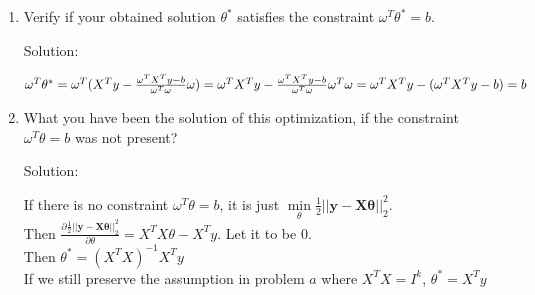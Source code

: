 \documentclass[12pt]{article}
\newcommand{\solu}{{\color{blue} Solution:}}
\begin{document}
\begin{enumerate}
\begin{enumerate}
            \item Verify if your obtained solution $\theta^*$ satisfies the constraint $\omega^T\theta^* = b$.
            
            \solu

            $\omega^T \theta^* \\
            = \omega^T(X^Ty - \frac{\omega^TX^T y - b}{\omega^T \omega} \omega)\\
            = \omega^TX^Ty - \frac{\omega^TX^T y - b}{\omega^T \omega} \omega^T \omega\\
            = \omega^TX^Ty - (\omega^TX^T y - b)\\
            = b$

            \item What you have been the solution of this optimization, if the constraint $\omega^T\theta = b$ was not present?
            
            \solu 

            If there is no constraint $\omega^T\theta = b$, it is just $\min\limits_\theta \frac{1}{2}||\mathbf{y} - \mathbf{X\theta}||^2_2$.\\
            Then $\frac{\partial \frac{1}{2}||\mathbf{y} - \mathbf{X\theta}||^2_2}{\partial \theta} = X^TX\theta - X^Ty$. Let it to be 0.\\
            Then $\theta^* = (X^TX)^{-1}X^Ty$\\
            If we still preserve the assumption in problem $a$ where $X^TX = I^k$, $\theta^* = X^Ty$


            

        \end{enumerate}
    \end{enumerate}    
\end{document}
